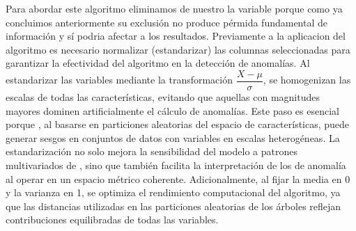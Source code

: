 \documentclass[a4paper,10pt,spanish]{jupyterBook}
\begin{document}
\sphinxAtStartPar
Para abordar este algoritmo eliminamos de nuestro  la variable  porque como ya concluimos anteriormente su exclusión no produce pérmida fundamental de información y sí podria afectar a los resultados. Previamente a la aplicacion del algoritmo es necesario normalizar (estandarizar) las columnas seleccionadas para garantizar la efectividad del algoritmo en la detección de anomalías. Al estandarizar las variables mediante la transformación \(\dfrac{X−μ}{σ}\), se homogenizan las escalas de todas las características, evitando que aquellas con magnitudes mayores dominen artificialmente el cálculo de anomalías. Este paso es esencial porque , al basarse en particiones aleatorias del espacio de características, puede generar sesgos en conjuntos de datos con variables en escalas heterogéneas. La estandarización no solo mejora la sensibilidad del modelo a patrones multivariados de , sino que también facilita la interpretación de los  de anomalía al operar en un espacio métrico coherente. Adicionalmente, al fijar la media en 0 y la varianza en 1, se optimiza el rendimiento computacional del algoritmo, ya que las distancias utilizadas en las particiones aleatorias de los árboles reflejan contribuciones equilibradas de todas las variables.
\end{document}
